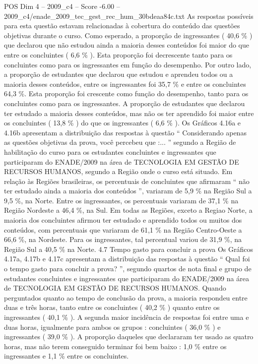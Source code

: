 \begin{textsample}{POS Dim 4 – 2009\_c4 – Score -6.00 – 2009\_c4/enade\_2009\_tec\_gest\_rec\_hum\_30bdeaa84c.txt}
As respostas possíveis para esta questão estavam relacionadas à cobertura do conteúdo das questões objetivas durante o curso.
Como esperado, a proporção de ingressantes ( 40,6 \% ) que declarou que não estudou ainda a maioria desses conteúdos foi maior do que entre os concluintes ( 6,6 \% ).
Esta proporção foi decrescente tanto para os concluintes como para os ingressantes em função do desempenho.
Por outro lado, a proporção de estudantes que declarou que estudou e aprendeu todos ou a maioria desses conteúdos, entre os ingressantes foi 35,7 \% e entre os concluintes 64,3 \%.
Esta proporção foi crescente como função do desempenho, tanto para os concluintes como para os ingressantes.
A proporção de estudantes que declarou ter estudado a maioria desses conteúdos, mas não os ter aprendido foi maior entre os concluintes ( 13,8 \% ) do que os ingressantes ( 6,6 \% ).
Os Gráficos 4.16a e 4.16b apresentam a distribuição das respostas à questão “ Considerando apenas as questões objetivas da prova, você percebeu que :... ” segundo a Região de habilitação do curso para os estudantes concluintes e ingressantes que participaram do ENADE/2009 na área de TECNOLOGIA EM GESTÃO DE RECURSOS HUMANOS, segundo a Região onde o curso está situado.
Em relação às Regiões brasileiras, os percentuais de concluintes que afirmaram “ não ter estudado ainda a maioria dos conteúdos ”, variaram de 5,9 \% na Região Sul a 9,5 \%, na Norte.
Entre os ingressantes, os percentuais variaram de 37,1 \% na Região Nordeste a 46,4 \%, na Sul.
Em todas as Regiões, exceto a Regiao Norte, a maioria dos concluintes afirmou ter estudado e aprendido todos ou muitos dos conteúdos, com percentuais que variaram de 61,1 \% na Região Centro-Oeste a 66,6 \%, na Nordeste.
Para os ingressantes, tal percentual variou de 31,9 \%, na Região Sul a 40,5 \% na Norte. 4.7 Tempo gasto para concluir a prova Os Gráficos 4.17a, 4.17b e 4.17c apresentam a distribuição das respostas à questão “ Qual foi o tempo gasto para concluir a prova? ”, segundo quartos de nota final e grupo de estudantes concluintes e ingressantes que participaram do ENADE/2009 na área de TECNOLOGIA EM GESTÃO DE RECURSOS HUMANOS.
Quando perguntados quanto ao tempo de conclusão da prova, a maioria respondeu entre duas e três horas, tanto entre os concluintes ( 40,2 \% ) quanto entre os ingressantes ( 40,1 \% ).
A segunda maior incidência de respostas foi entre uma e duas horas, igualmente para ambos os grupos : concluintes ( 36,0 \% ) e ingressantes ( 39,0 \% ).
A proporção daqueles que declararam ter usado as quatro horas, mas não terem conseguido terminar foi bem baixo : 1,0 \% entre os ingressantes e 1,1 \% entre os concluintes.

\end{textsample}

